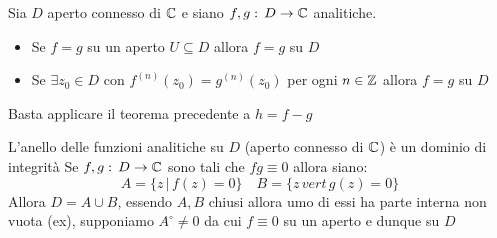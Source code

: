 \spazio
\begin{cor}
Sia $D$ aperto connesso di $\mathbb{C}$ e siano $f,g:\, D \to \mathbb{C}$ analitiche.
\begin{itemize}
\item Se $f=g$ su un aperto $U\subseteq D$ allora $f=g$ su $D$ 
\item Se $\exists z_0\in D$ con $f^{(n)}(z_0)=g^{(n)}(z_0)$ per ogni $n\in \mathbb{Z}$ allora $f=g$ su $D$
\end{itemize}
\proof Basta applicare il teorema precedente a $h=f-g$
\end{cor}
\begin{cor}L'anello delle funzioni analitiche su $D$ (aperto connesso di $\mathbb{C}$) \`e un dominio di integrit\`a
\proof Se $f,g:\, D \to \mathbb{C}$ sono tali che $fg\equiv 0 $ allora siano:
$$A=\{ z \, \vert \, f(z)=0\} \quad B=\{ z \, vert \, g(z)=0\}$$
Allora $D=A\cup B$, essendo $A,B$ chiusi allora umo di essi ha parte interna non vuota (ex), supponiamo $A^\circ\neq 0 $ da cui $f\equiv 0$ su un aperto e dunque su $D$
\end{cor}
\newpage
